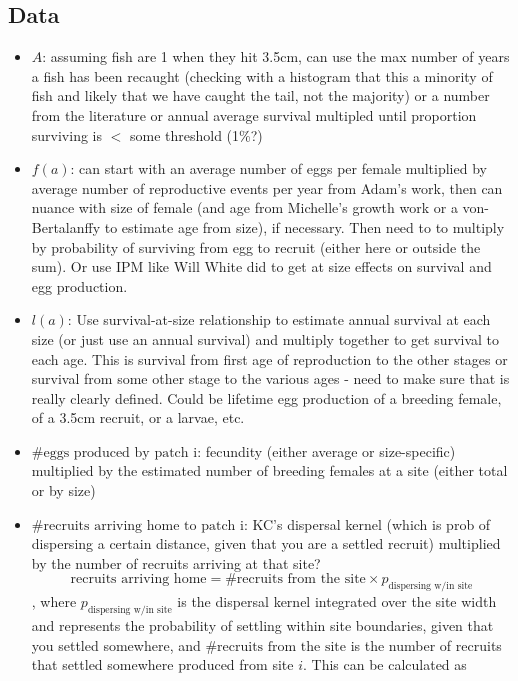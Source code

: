 \documentclass[12pt, oneside]{article}   	%
\begin{document}
\subsection*{Data}
\begin{itemize}
\item $A$: assuming fish are 1 when they hit 3.5cm, can use the max number of years a fish has been recaught (checking with a histogram that this a minority of fish and likely that we have caught the tail, not the majority) or a number from the literature or annual average survival multipled until proportion surviving is $<$ some threshold (1\%?)
\item $f(a)$: can start with an average number of eggs per female multiplied by average number of reproductive events per year from Adam's work, then can nuance with size of female (and age from Michelle's growth work or a von-Bertalanffy to estimate age from size), if necessary. Then need to to multiply by probability of surviving from egg to recruit (either here or outside the sum). Or use IPM like Will White did to get at size effects on survival and egg production. %
\item $l(a)$: Use survival-at-size relationship to estimate annual survival at each size (or just use an annual survival) and multiply together to get survival to each age. This is survival from first age of reproduction to the other stages or survival from some other stage to the various ages - need to make sure that is really clearly defined. Could be lifetime egg production of a breeding female, of a 3.5cm recruit, or a larvae, etc.
\item $\# \text{eggs produced by patch i}$: fecundity (either average or size-specific) multiplied by the estimated number of breeding females at a site (either total or by size)
\item $\# \text{recruits arriving home to patch i}$: KC's dispersal kernel  (which is prob of dispersing a certain distance, given that you are a settled recruit) multiplied by the number of recruits arriving at that site? \\
\[
\text{recruits arriving home} = \text{\# recruits from the site} \times p_{\text{dispersing w/in site}}
\],
where $p_{\text{dispersing w/in site}}$ is the dispersal kernel integrated over the site width and represents the probability of settling within site boundaries, given that you settled somewhere, and $\text{\# recruits from the site}$ is the number of recruits that settled somewhere produced from site $i$. This can be calculated as 

\end{itemize}
\end{document}

